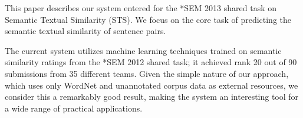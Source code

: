 This paper describes our system entered for the *SEM 2013 shared task on Semantic Textual Similarity (STS).  We focus on the core task of predicting
 the semantic textual similarity of sentence pairs.
 
 The current system utilizes machine learning techniques trained on semantic
 similarity ratings from the *SEM 2012 shared task; it achieved rank 20
 out of 90 submissions from 35 different teams.                                Given
 the
 simple
 nature
 of 
 our approach, which uses only WordNet and unannotated corpus data as external
 resources, we consider this a remarkably good result, making the system 
 an interesting tool for a wide range of practical applications.

